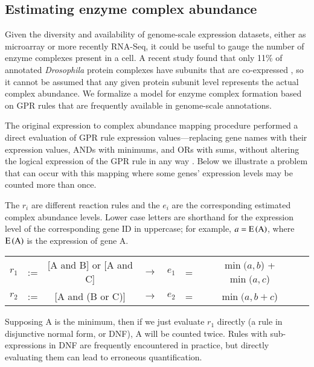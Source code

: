 \subsection{Estimating enzyme complex abundance}

Given the diversity and availability of genome-scale expression datasets,
either as microarray or more recently RNA-Seq, it could be useful to
gauge the number of enzyme complexes present in a cell. A recent
study found that only 11\% of annotated \textit{Drosophila}
protein complexes have subunits that are co-expressed
\citep{Juschke2013}, so it cannot be assumed that any given protein
subunit level represents the actual complex abundance. We formalize a
model for enzyme complex formation based on GPR rules that are
frequently available in genome-scale annotations.

The original expression to complex abundance mapping procedure
performed a direct evaluation of GPR rule expression
values---replacing gene names with their expression values, ANDs with
minimums, and ORs with sums, without altering the logical expression
of the GPR rule in any way \citep{Lee2012}. Below we illustrate a 
problem that can occur with this mapping where some genes' expression
levels may be counted more than once. 

The $r_i$ are different reaction rules and the $e_i$ are the
corresponding estimated complex abundance levels. Lower case letters
are shorthand for the expression level of the corresponding gene ID in
uppercase; for example, $a = \operatorname{E}\left(\textnormal{A}\right)$, where
$\operatorname{E}\left(\textnormal{A}\right)$ is the expression of gene A.

\begin{center}
{\setlength{\tabcolsep}{.16667em}
\begin{tabular}{cccccccc}
$r_1$ & := & [A and B] or [A and C] & $\rightarrow$ & $e_1$  &=& $\min(a,b$) + $\min(a,c$) \\ 
$r_2$ & := & [A and (B or C)]       & $\rightarrow$ & $e_2$  &=&  $\min(a, b + c$) 
\end{tabular} 
}
\end{center}

Supposing A is the minimum, then if we just evaluate $r_1$ directly (a
rule in disjunctive normal form, or DNF), A will be counted twice.
Rules with sub-expressions in DNF are frequently encountered in practice,
but directly evaluating them can lead to erroneous quantification.

